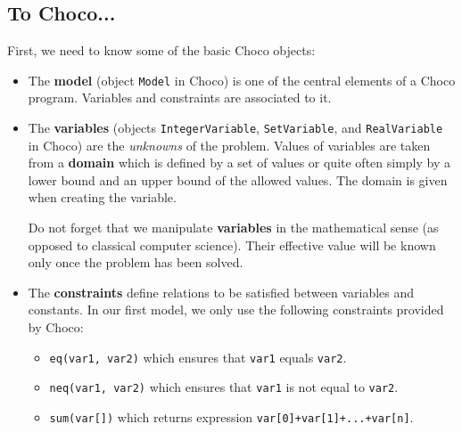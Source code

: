 \subsection{To Choco...}\label{introduction:inchoco}\hypertarget{introduction:inchoco}{}

First, we need to know some of the basic Choco objects:
\begin{itemize}
\item 
The \textbf{model} (object \texttt{Model} in Choco) is one of the central elements of a Choco program. Variables and constraints are associated to it.
\item
The \textbf{variables} (objects \texttt{IntegerVariable}, \texttt{SetVariable}, and \texttt{RealVariable} in Choco) are the \emph{unknowns} of the problem. Values of variables are taken from a \textbf{domain} which is defined by a set of values or quite often simply by a lower bound and an upper bound of the allowed values. The domain is given when creating the variable.
\begin{note}
Do not forget that we manipulate \textbf{variables} in the mathematical sense (as opposed to classical computer science). Their effective value will be known only once the problem has been solved.
\end{note}
\item
The \textbf{constraints} define relations to be satisfied between variables and constants.
In our first model, we only use the following constraints provided by Choco:
\begin{itemize}
	\item \texttt{eq(var1, var2)} which ensures that \texttt{var1} equals \texttt{var2}.
	\item \texttt{neq(var1, var2)} which ensures that \texttt{var1} is not equal to \texttt{var2}.
	\item \texttt{sum(var[])} which returns expression \texttt{var[0]+var[1]+...+var[n]}.
\end{itemize}
\end{itemize}

